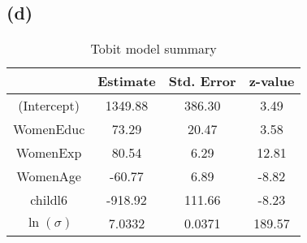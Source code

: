 \documentclass[a4paper]{article}
\begin{document}
\subsection*{(d)}

\begin{table}[h!]
    \centering
    \begin{tabular}{|cccc|}
    \hline
    \textbf{}   & \textbf{Estimate} & \textbf{Std. Error} & \textbf{z-value} \\ \hline
     (Intercept) &     1349.88    &     386.30      & 3.49      \\ %
     WomenEduc  &      73.29      &       20.47       & 3.58      \\ %
     WomenExp   &      80.54      &        6.29        & 12.81     \\ %
     WomenAge   &      -60.77     &       6.89       & -8.82     \\ %
     childl6    &       -918.92   &       111.66    & -8.23     \\ 
     $\ln(\sigma)$ &  7.0332  &  0.0371 & 189.57     \\\hline
    \end{tabular}
    \caption{Tobit model summary}
    \label{tab:Tobit}
\end{table}
\end{document}
